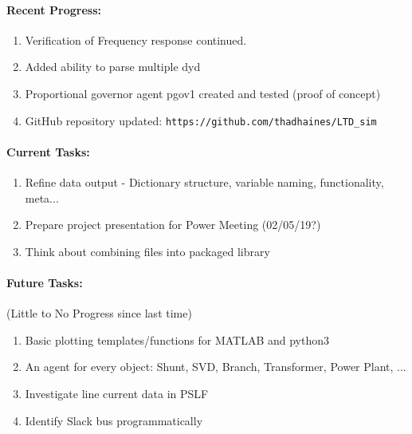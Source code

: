 \documentclass[12pt]{article}
\begin{document}
	\paragraph{Recent Progress:}
	\begin{enumerate}
		\item Verification of Frequency response continued.
		
		\item Added ability to parse multiple dyd
		
		\item Proportional governor agent pgov1 created and tested (proof of concept)
		
		\item GitHub repository updated:
		\subitem \verb|https://github.com/thadhaines/LTD_sim|
		
	\end{enumerate}
\paragraph{Current Tasks:}
	\begin{enumerate}	
		\item Refine data output - Dictionary structure, variable naming, functionality, meta...
		\item Prepare project presentation for Power Meeting (02/05/19?)
		\item Think about combining files into packaged library
	\end{enumerate}
\paragraph{Future Tasks:}(Little to No Progress since last time)
	\begin{enumerate}
		
		\item Basic plotting templates/functions for MATLAB and python3
		
		\item An agent for every object: Shunt, SVD, Branch, Transformer, Power Plant, ...
		
		\item Investigate line current data in PSLF
		
		\item Identify Slack bus programmatically
		
	\end{enumerate}
\end{document}
